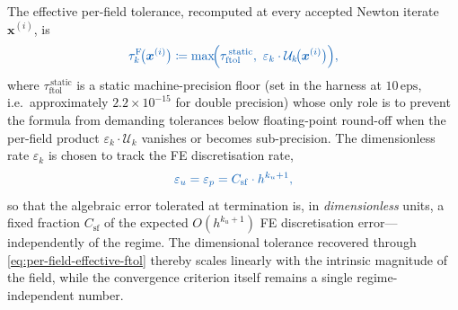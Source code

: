 \documentclass{article}
\newcommand{\textftol}{\tau_{\mathrm{ftol}}}
\newcommand{\extline}[1]{{\color{extcolor}#1}}
\begin{document}
\extline{The effective per-field tolerance, recomputed at every
accepted Newton iterate $\boldsymbol{x}^{(i)}$, is}
\begin{equation}
    \label{eq:per-field-effective-ftol}
    \textcolor{extcolor}{
    \tau^{\mathrm{F}}_{k}\!\bigl(\boldsymbol{x}^{(i)}\bigr)
    \coloneqq \max\!\Bigl(\textftol^{\,\mathrm{static}},\
        \varepsilon_{k} \cdot \mathcal{U}_{k}\!\bigl(\boldsymbol{x}^{(i)}\bigr)\Bigr),}
\end{equation}
\extline{where $\textftol^{\,\mathrm{static}}$ is a static
machine-precision floor (set in the harness at $10\,\mathrm{eps}$,
i.e.\ approximately $2.2\times 10^{-15}$ for double precision) whose
only role is to prevent the formula from demanding tolerances below
floating-point round-off when the per-field product
$\varepsilon_{k}\cdot \mathcal{U}_{k}$ vanishes or becomes
sub-precision. The dimensionless rate $\varepsilon_{k}$ is chosen to track
the FE discretisation rate,}
\begin{equation}
    \label{eq:per-field-rate}
    \textcolor{extcolor}{
    \varepsilon_{u} = \varepsilon_{p} = C_{\mathrm{sf}} \cdot h^{k_u+1},}
\end{equation}
\extline{so that the algebraic error tolerated at termination is, in
\emph{dimensionless} units, a fixed fraction $C_{\mathrm{sf}}$ of the
expected $O(h^{k_u+1})$ FE discretisation error---independently of
the regime. The dimensional tolerance recovered through
\eqref{eq:per-field-effective-ftol} thereby scales linearly with the
intrinsic magnitude of the field, while the convergence criterion
itself remains a single regime-independent number.}
\end{document}
